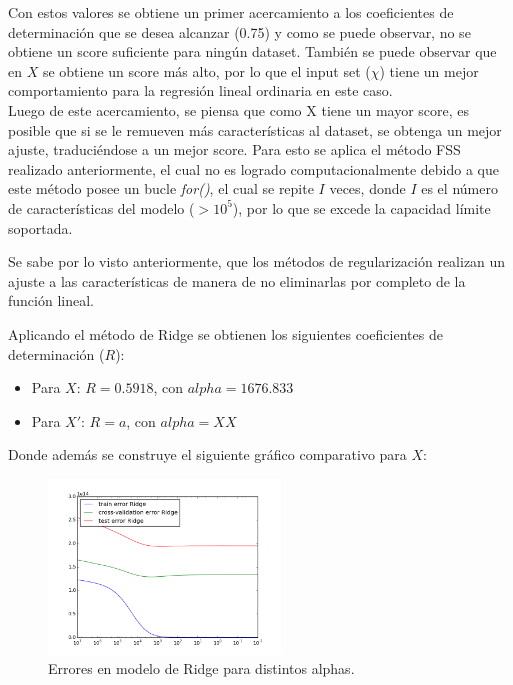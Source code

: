 \documentclass[10pt]{article}
\begin{document}
\begin{itemize}
Con estos valores se obtiene un primer acercamiento a los coeficientes de determinación que se desea alcanzar (0.75) y como se puede observar, no se obtiene un score suficiente para ningún dataset. También se puede observar que en $X$ se obtiene un score más alto, por lo que el input set ($\chi$) tiene un mejor comportamiento para la regresión lineal ordinaria en este caso.\\

Luego de este acercamiento, se piensa que como X tiene un mayor score, es posible que si se le remueven más características al dataset, se obtenga un mejor ajuste, traduciéndose a un mejor score. Para esto se aplica el método FSS realizado anteriormente, el cual no es logrado computacionalmente debido a que este método posee un bucle \textit{for()}, el cual se repite $I$ veces, donde $I$ es el número de características del modelo ($> 10^5$), por lo que se excede la capacidad límite soportada.

Se sabe por lo visto anteriormente, que los métodos de regularización realizan un ajuste a las características de manera de no eliminarlas por completo de la función lineal.

Aplicando el método de Ridge se obtienen los siguientes coeficientes de determinación ($R$):

\begin{itemize}

\item Para $X$: $R=0.5918$, con $alpha = 1676.833$
\item Para $X'$: $R=a$, con $alpha = XX$

\end{itemize}

Donde además se construye el siguiente gráfico comparativo para $X$:

\begin{figure}[!htb]
   \centering
   \includegraphics[width=0.55\textwidth]{images/comparacion_ridge}
   \caption{Errores en modelo de Ridge para distintos alphas.}
   \label{err:lasso}
\end{figure}


\end{itemize}
\end{document}
